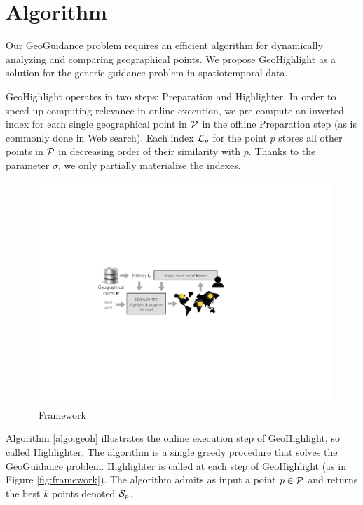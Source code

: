 \section{Algorithm}
\label{sec:algo}
Our {\sc GeoGuidance} problem requires an efficient algorithm for dynamically analyzing and comparing geographical points. We propose {\sc GeoHighlight} as a solution for the generic guidance problem in spatiotemporal data. 

{\sc GeoHighlight} operates in two steps: {\sc Preparation} and {\sc Highlighter}. In order to speed up computing relevance in online execution, we pre-compute an inverted index for each single geographical point in ${\cal P}$ in the offline {\sc Preparation} step (as is commonly done in Web search). Each index ${\cal L}_p$ for the point $p$ stores all other points in ${\cal P}$ in decreasing order of their similarity with $p$. Thanks to the parameter $\sigma$, we only partially materialize the indexes.


\begin{figure}
  \centering
  \includegraphics[width=\columnwidth]{figs/framework}
\caption{\framework\ Framework}
\label{fig:framwork}
\end{figure}

Algorithm \ref{algo:geoh} illustrates the online execution step of {\sc GeoHighlight}, so called {\sc Highlighter}. The algorithm is a single greedy procedure that solves the {\sc GeoGuidance} problem. {\sc Highlighter} is called at each step of {\sc GeoHighlight} (as in Figure \ref{fig:framework}). The algorithm admits as input a point $p \in {\cal P}$ and returns the best $k$ points denoted ${\cal S}_p$.

